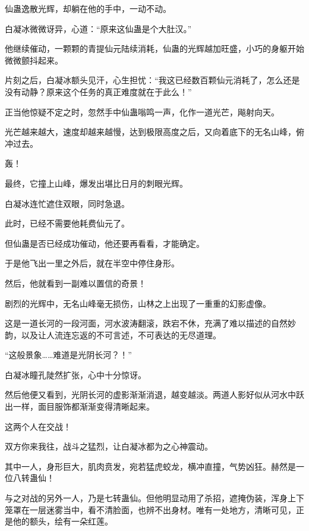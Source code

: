 \begin{this_body}
仙蛊逸散光辉，却躺在他的手中，一动不动。

白凝冰微微讶异，心道：“原来这仙蛊是个大肚汉。”

他继续催动，一颗颗的青提仙元陆续消耗，仙蛊的光辉越加旺盛，小巧的身躯开始微微颤抖起来。

片刻之后，白凝冰额头见汗，心生担忧：“我这已经数百颗仙元消耗了，怎么还是没有动静？原来这个任务的真正难度就在于此么！”

正当他惊疑不定之时，忽然手中仙蛊嗡鸣一声，化作一道光芒，飚射向天。

光芒越来越大，速度却越来越慢，达到极限高度之后，又向着底下的无名山峰，俯冲过去。

轰！

最终，它撞上山峰，爆发出堪比日月的刺眼光辉。

白凝冰连忙遮住双眼，同时急退。

此时，已经不需要他耗费仙元了。

但仙蛊是否已经成功催动，他还要再看看，才能确定。

于是他飞出一里之外后，就在半空中停住身形。

然后，他就看到一副难以置信的奇景！

剧烈的光辉中，无名山峰毫无损伤，山林之上出现了一重重的幻影虚像。

这是一道长河的一段河面，河水波涛翻滚，跌宕不休，充满了难以描述的自然妙韵，以及让人流连忘返的不可言述，不可表达的无尽道理。

“这般景象……难道是光阴长河？！”

白凝冰瞳孔陡然扩张，心中十分惊讶。

然后他便又看到，光阴长河的虚影渐渐消退，越变越淡。两道人影好似从河水中跃出一样，面目服饰都渐渐变得清晰起来。

这两个人在交战！

双方你来我往，战斗之猛烈，让白凝冰都为之心神震动。

其中一人，身形巨大，肌肉贲发，宛若猛虎蛟龙，横冲直撞，气势凶狂。赫然是一位八转蛊仙！

与之对战的另外一人，乃是七转蛊仙。但他明显动用了杀招，遮掩伪装，浑身上下笼罩在一层迷雾当中，看不清脸面，也辨不出身材。唯有一处地方，清晰可见，正是他的额头，绘有一朵红莲。

\end{this_body}

